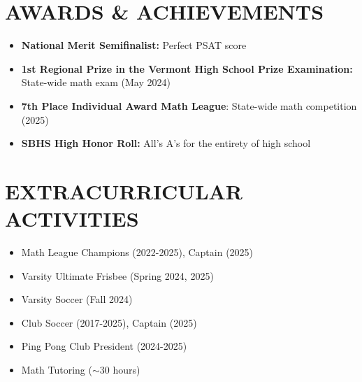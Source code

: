 \documentclass[10pt,letterpaper]{article}
\begin{document}
\vspace{0.5em}
\section{AWARDS \& ACHIEVEMENTS}
\vspace{0.5em}
\begin{itemize}[leftmargin=*,nosep,itemsep=2pt]
  \item \textbf{National Merit Semifinalist:} Perfect PSAT score
  \item \textbf{1st Regional Prize in the Vermont High School Prize Examination:} State-wide math exam (May 2024)
  \item \textbf{7th Place Individual Award Math League}: State-wide math competition (2025)
  \item \textbf{SBHS High Honor Roll:} All's A's for the entirety of high school
\end{itemize}

\vspace{0.5em}
\section{EXTRACURRICULAR ACTIVITIES}
\vspace{0.5em}
\begin{minipage}[t]{0.48\textwidth}
\begin{itemize}[leftmargin=*,nosep,itemsep=2pt]
  \item Math League Champions (2022-2025), Captain (2025)
  \item Varsity Ultimate Frisbee (Spring 2024, 2025)
  \item Varsity Soccer (Fall 2024)
\end{itemize}
\end{minipage}
\hfill
\begin{minipage}[t]{0.48\textwidth}
\begin{itemize}[leftmargin=*,nosep,itemsep=2pt]
  \item Club Soccer (2017-2025), Captain (2025)
  \item Ping Pong Club President (2024-2025)
  \item Math Tutoring ($\sim$30 hours)
\end{itemize}
\end{minipage}
\end{document}
